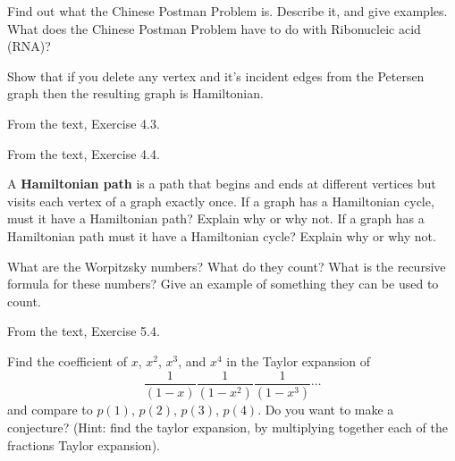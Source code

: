 
\begin{exercise}
Find out what the Chinese Postman Problem is.  Describe it, and give examples.  What does the Chinese Postman Problem have to do with Ribonucleic acid (RNA)?
\end{exercise}


\begin{exercise}
Show that if you delete any vertex and it's incident edges from the Petersen graph then the resulting graph is Hamiltonian.
\end{exercise}


\begin{exercise}
From the text, Exercise 4.3.
\end{exercise}

\begin{exercise}
From the text, Exercise 4.4.
\end{exercise}

\begin{exercise}
A {\bf Hamiltonian path} is a path that begins and ends at different vertices but visits each vertex of a graph exactly once.  If a graph has a Hamiltonian cycle, must it have a Hamiltonian path?  Explain why or why not.  If a graph has a Hamiltonian path must it have a Hamiltonian cycle? Explain why or why not.
\end{exercise}


\begin{exercise}
What are the Worpitzsky numbers?  What do they count?  What is the recursive formula for these numbers?  Give an example of something they can be used to count.
\end{exercise}

\begin{exercise}
From the text, Exercise 5.4.
\end{exercise}


\begin{exercise}
Find the coefficient of $x$, $x^2$, $x^3$, and $x^4$ in the Taylor expansion of 
$$\frac{1}{(1-x)}\frac{1}{(1-x^2)}\frac{1}{(1-x^3)}\cdots$$ 
and compare to $p(1)$, $p(2)$, $p(3)$, $p(4)$.  Do you want to make a conjecture?  (Hint: find the taylor expansion, by multiplying together each of the fractions Taylor expansion).
\end{exercise}

